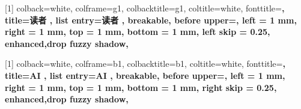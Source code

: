 \pagestyle{main}
\geometry{
  a4paper,
  left=3cm,
  right=3cm,
  top=2.54cm,
  bottom=2.54cm,
  headheight=1.5cm,
  headsep=10pt
}


\graphicspath{ {assets/figures/} }


\theoremstyle{plain}
\newtheorem{theorem}{Theorem}[section]
\newtheorem{proposition}[theorem]{Proposition}
\newtheorem{lemma}[theorem]{Lemma}
\newtheorem{corollary}[theorem]{Corollary}
\theoremstyle{definition}
\newtheorem{definition}[theorem]{Definition}
\newtheorem{assumption}[theorem]{Assumption}
\theoremstyle{remark}
\newtheorem{remark}[theorem]{Remark}




[1]{
        colback=white, 
        colframe=g1, %
        colbacktitle=g1, 
        coltitle=white, %
        fonttitle=\bfseries, 
        title={读者 \thetcbcounter}, 
        list entry={读者 \thetcbcounter\quad}, %
        breakable, %
        before upper={\parindent10pt\noindent},  %
        left = 1 mm, %
        right = 1 mm, %
        top = 1 mm, %
        bottom = 1 mm,%
        left skip = 0.25\textwidth,
        enhanced,drop fuzzy shadow,  %
}

[1]{
        colback=white, 
        colframe=b1, %
        colbacktitle=b1, 
        coltitle=white, %
        fonttitle=\bfseries, 
        title={AI \thetcbcounter}, 
        list entry={AI \thetcbcounter\quad}, %
        breakable, %
        before upper={\parindent10pt\noindent},  %
        left = 1 mm, %
        right = 1 mm, %
        top = 1 mm, %
        bottom = 1 mm,%
        right skip = 0.25\textwidth,
        enhanced,drop fuzzy shadow,  %
}

